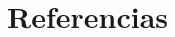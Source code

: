 \section{Referencias}
\begin{scriptsize}
\begin{thebibliography}{1}
\begin{frame}
\begin{block}

%
%
%
%
%
%
%
%  
%
%
%
%


\end{block}
\end{frame}
\end{thebibliography}
\end{scriptsize}
